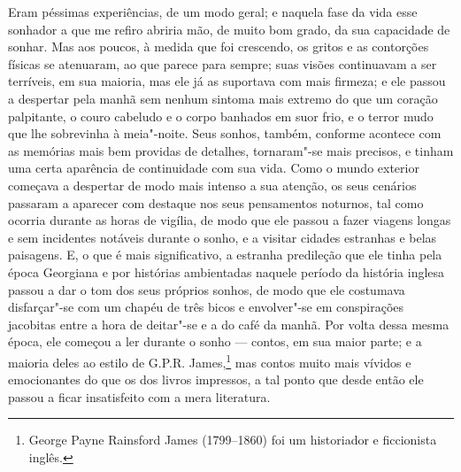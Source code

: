 Eram péssimas experiências, de um modo geral; e naquela fase da vida
esse sonhador a que me refiro abriria mão, de muito bom grado, da sua
capacidade de sonhar.  Mas aos poucos, à medida que foi crescendo, os
gritos e as contorções físicas se atenuaram, ao que parece para sempre;
suas visões continuavam a ser terríveis, em sua maioria, mas ele já as
suportava com mais firmeza; e ele passou a despertar pela manhã sem
nenhum sintoma mais extremo do que um coração palpitante, o couro
cabeludo e o corpo banhados em suor frio, e o terror mudo que lhe
sobrevinha à meia"-noite.  Seus sonhos, também, conforme acontece com as
memórias mais bem providas de detalhes, tornaram"-se mais precisos, e
tinham uma certa aparência de continuidade com sua vida.  Como o mundo
exterior começava a despertar de modo mais intenso a sua atenção, os
seus cenários passaram a aparecer com destaque nos seus pensamentos
noturnos, tal como ocorria durante as horas de vigília, de modo que ele
passou a fazer viagens longas e sem incidentes notáveis durante o
sonho, e a visitar cidades estranhas e belas paisagens.  E, o que é
mais significativo, a estranha predileção que ele tinha pela época
Georgiana e por histórias ambientadas naquele período da história
inglesa passou a dar o tom dos seus próprios sonhos, de modo que ele
costumava disfarçar"-se com um chapéu de três bicos e envolver"-se em
conspirações jacobitas entre a hora de deitar"-se e a do café da manhã. 
Por volta dessa mesma época, ele começou a ler durante o sonho ---
contos, em sua maior parte; e a maioria deles ao estilo de G.P.R.
James,\footnote{ George Payne Rainsford James (1799--1860) foi um historiador 
e ficcionista inglês.} 
mas contos muito mais vívidos e emocionantes do que os dos
livros impressos, a tal ponto que desde então ele passou a ficar
insatisfeito com a mera literatura.

